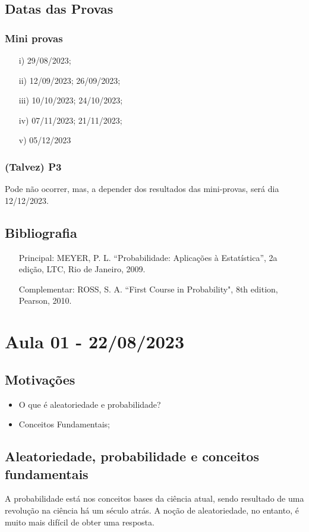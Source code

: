 \documentclass{article}
\begin{document}
\subsection*{Datas das Provas}
\subsubsection*{Mini provas}
\begin{itemize}
  \item[i)] 29/08/2023;
  \item[ii)] 12/09/2023; 26/09/2023;
  \item[iii)] 10/10/2023; 24/10/2023;
  \item[iv)] 07/11/2023; 21/11/2023;
  \item[v)] 05/12/2023
\end{itemize}
\subsubsection*{(Talvez) P3}
Pode não ocorrer, mas, a depender dos resultados das mini-provas, será dia 12/12/2023.
\subsection*{Bibliografia}
\begin{itemize}
  \item[Principal:] MEYER, P. L. ``Probabilidade: Aplicações à Estatística'', 2a edição, LTC, Rio de Janeiro, 2009.
  \item[Complementar:] ROSS, S. A. ``First Course in Probability", 8th edition, Pearson, 2010.
\end{itemize}

\newpage
\section{Aula 01 - 22/08/2023}
\subsection{Motivações}
\begin{itemize}
  \item O que é aleatoriedade e probabilidade?
  \item Conceitos Fundamentais;
\end{itemize}
\subsection{Aleatoriedade, probabilidade e conceitos fundamentais}
A probabilidade está nos conceitos bases da ciência atual, sendo resultado de uma revolução na ciência há um século atrás.
A noção de aleatoriedade, no entanto, é muito mais difícil de obter uma resposta.
\end{document}
